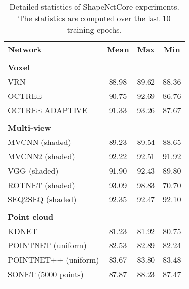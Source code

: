 \begin{table}[!h]
    \centering
	    \begin{tabular}{lccc}
	    	\hline
	    	\textbf{Network}       & \textbf{Mean} & \textbf{Max} & \textbf{Min} \\ \hline
	    	                       &               &              &              \\
	    	\textbf{Voxel }        &               &              &              \\
	    	VRN                    &     88.98     &    89.62     &    88.36     \\
	    	OCTREE                 &     90.75     &    92.69     &    86.76     \\
	    	OCTREE ADAPTIVE        &     91.33     &    93.26     &    87.67     \\ \hline
	    	                       &               &              &              \\
	    	\textbf{Multi-view }   &               &              &              \\
	    	MVCNN (shaded)         &     89.23     &    89.54     &    88.65     \\
	    	MVCNN2 (shaded)        &     92.22     &    92.51     &    91.92     \\
	    	VGG (shaded)           &     91.90     &    92.43     &    89.80     \\
	    	ROTNET (shaded)        &     93.09     &    98.83     &    70.70     \\
	    	SEQ2SEQ (shaded)       &     92.35     &    92.47     &    92.10     \\ \hline
	    	                       &               &              &              \\
	    	\textbf{Point cloud  } &               &              &              \\
	    	KDNET                  &     81.23     &    81.92     &    80.75     \\
	    	POINTNET (uniform)     &     82.53     &    82.89     &    82.24     \\
	    	POINTNET++ (uniform)   &     83.67     &    83.80     &    83.48     \\
	    	SONET (5000 points)    &     87.87     &    88.23     &    87.47     \\ \hline
	    	                       &               &              &
	    \end{tabular}
\caption{Detailed statistics of ShapeNetCore experiments. The statistics are computed over the last 10 training epochs.}
\label{Table:detailss}
\end{table}
